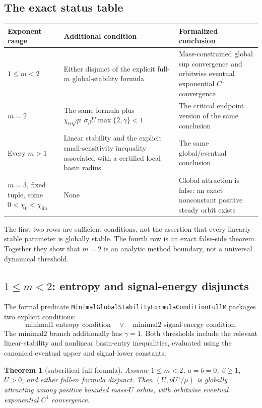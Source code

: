 \documentclass[11pt]{article}
\newcommand{\code}[1]{\nolinkurl{#1}}
\newtheorem{theorem}{Theorem}
\begin{document}
\subsection{The exact status table}

\begin{center}
\small
\renewcommand{\arraystretch}{1.2}
\begin{tabular}{@{}p{}p{}p{}@{}}
\toprule
Exponent range & Additional condition & Formalized conclusion\\
\midrule
\(1\le m<2\) &
Either disjunct of the explicit full-\(m\) global-stability formula &
Mass-constrained global sup convergence and orbitwise eventual exponential
\(C^1\) convergence\\
\(m=2\) &
The same formula plus
\(\chi_0\sqrt\mu\,\sigma_\beta U\max\{2,\gamma\}<1\) &
The critical endpoint version of the same conclusion\\
Every \(m>1\) &
Linear stability and the explicit small-sensitivity inequality associated
with a certified local basin radius &
The same global/eventual conclusion\\
\(m=3\), fixed tuple, some
\(0<\chi_0<\chi_{\mathrm{lin}}\) &
None &
Global attraction is false: an exact nonconstant positive steady orbit
exists\\
\bottomrule
\end{tabular}
\end{center}

\noindent The first two rows are sufficient conditions, not the assertion
that every linearly stable parameter is globally stable.  The fourth row is
an exact false-side theorem.  Together they show that \(m=2\) is an analytic
method boundary, not a universal dynamical threshold.

\subsection{\(1\le m<2\): entropy and signal-energy disjuncts}

The formal predicate
\code{MinimalGlobalStabilityFormula}\allowbreak\code{ConditionFullM}
packages two explicit conditions:
\[
 \text{minimal1 entropy condition}
 \quad\lor\quad
 \text{minimal2 signal-energy condition}.
\]
The minimal2 branch additionally has \(\gamma=1\).  Both thresholds include
the relevant linear-stability and nonlinear basin-entry inequalities,
evaluated using the canonical eventual upper and signal-lower constants.

\begin{theorem}[subcritical full formula]
Assume \(1\le m<2\), \(a=b=0\), \(\beta\ge1\), \(U>0\), and either
full-\(m\) formula disjunct.  Then \((U,\nu U^\gamma/\mu)\) is globally
attracting among positive bounded mass-\(U\) orbits, with orbitwise eventual
exponential \(C^1\) convergence.
\end{theorem}
\end{document}
